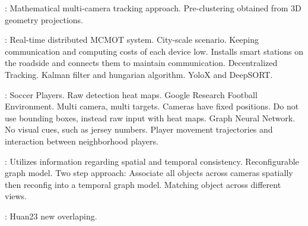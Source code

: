 \cite{Nguyen22a}: Mathematical multi-camera tracking approach. Pre-clustering obtained from 3D geometry projections.

\cite{Chen22}: Real-time distributed MCMOT system. City-scale scenario. Keeping communication and computing costs of each device low. Installs smart stations on the roadside and connects them to maintain communication. Decentralized Tracking. Kalman filter and hungarian algorithm. YoloX and DeepSORT.

\cite{Komorowski22}: Soccer Players. Raw detection heat maps. Google Research Football Environment. Multi camera, multi targets. Cameras have fixed positions. Do not use bounding boxes, instead raw input with heat maps. Graph Neural Network. No visual cues, such as jersey numbers. Player movement trajectories and interaction between neighborhood players.

\cite{Cheng23}: Utilizes information regarding spatial and temporal consistency. Reconfigurable graph model. Two step approach: Associate all objects across cameras spatially then reconfig into a temporal graph model. Matching object across different views.

\cite{Huang23}: Huan23 new overlaping.